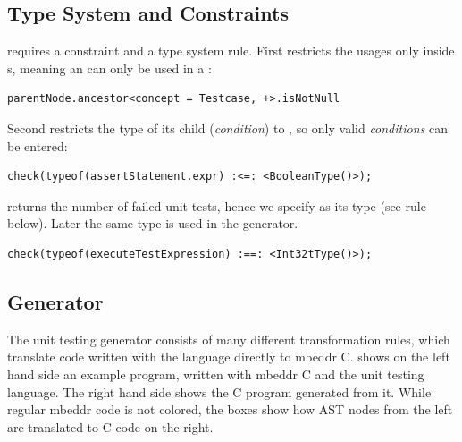 \subsection{Type System and Constraints}

 requires a constraint and a type
system rule. First restricts the usages only inside s, meaning an
 can only be used in a :
\begin{lstlisting}[language=constraintsAndTS,frame=single]
parentNode.ancestor<concept = Testcase, +>.isNotNull
\end{lstlisting}

Second restricts the type of its child  (\emph{condition}) to
, so only valid \emph{conditions} can be entered:
\begin{lstlisting}[language=constraintsAndTS,frame=single]
check(typeof(assertStatement.expr) :<=: <BooleanType()>);
\end{lstlisting}

 returns the number of failed unit tests,  
hence we specify  as its type (see rule below). Later the same
type is used in the generator.

\begin{lstlisting}[language=constraintsAndTS,frame=single]
check(typeof(executeTestExpression) :==: <Int32tType()>);
\end{lstlisting}


\subsection{Generator}

The unit testing generator consists of many different transformation rules,
which translate code written with the language directly to mbeddr C.  shows
on the left hand side an example program, written with mbeddr C and the unit
testing language. The right hand side shows the C program generated from it.
While regular mbeddr code is not colored, the boxes show how \ac{AST} nodes from the
left are translated to C code on the right.

